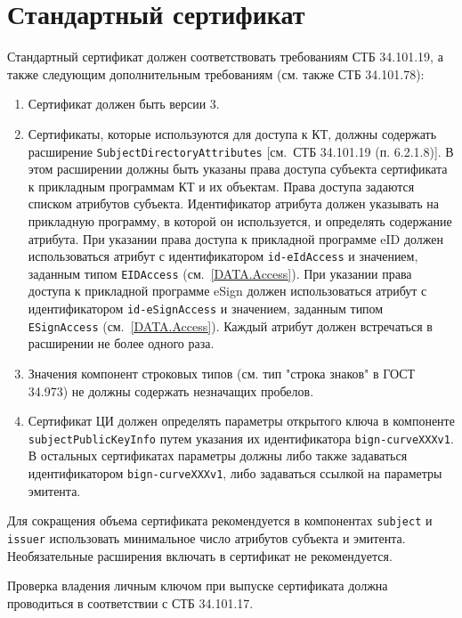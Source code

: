 \section{Стандартный сертификат}\label{CERTS.Std}

Стандартный сертификат должен соответствовать требованиям СТБ 34.101.19, 
а также следующим дополнительным требованиям ({см. также СТБ 34.101.78}):  

\begin{enumerate}
\item
Сертификат должен быть версии 3.

\item
Сертификаты, которые используются для доступа к КТ, должны содержать 
расширение \verb|SubjectDirectoryAttributes| [см.~СТБ 34.101.19 (п. 6.2.1.8)]. 
В этом расширении должны быть указаны права доступа субъекта сертификата к 
прикладным программам КТ и их объектам. Права доступа задаются списком 
атрибутов субъекта. Идентификатор атрибута должен указывать на прикладную 
программу, в которой он используется, и определять содержание атрибута. 
При указании права доступа к прикладной программе eID должен использоваться атрибут с 
идентификатором \verb|id-eIdAccess| и значением, 
заданным типом \verb|EIDAccess| (см.~\ref{DATA.Access}). 
При указании права доступа к прикладной программе eSign 
должен использоваться атрибут с идентификатором \verb|id-eSignAccess| и значением, 
заданным типом \verb|ESignAccess| (см.~\ref{DATA.Access}). 
Каждый атрибут должен встречаться в расширении не более одного раза.

\item
Значения компонент строковых типов (см. тип "строка знаков" в ГОСТ 34.973) 
не должны содержать незначащих пробелов. 

\item
Сертификат ЦИ должен определять параметры открытого ключа в компоненте 
\verb|subjectPublicKeyInfo| путем указания их идентификатора \verb|bign-curveXXXv1|. 
В остальных сертификатах параметры должны либо также задаваться 
идентификатором \verb|bign-curveXXXv1|, либо задаваться ссылкой на 
параметры эмитента. 
\end{enumerate}

Для сокращения объема сертификата рекомендуется в компонентах \verb|subject| и 
\verb|issuer| использовать минимальное число атрибутов субъекта и эмитента. 
Необязательные расширения включать в сертификат не рекомендуется. 

Проверка владения личным ключом при выпуске сертификата должна проводиться 
в соответствии с СТБ 34.101.17. 

